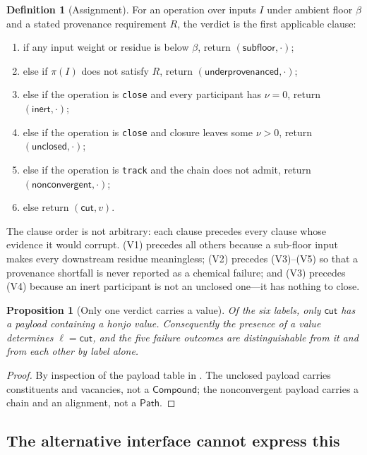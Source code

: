 \documentclass[11pt,twocolumn,a4paper]{article}
\theoremstyle{thmstyle}
\newtheorem{proposition}[theorem]{Proposition}
\theoremstyle{definition}
\newtheorem{definition}[theorem]{Definition}
\theoremstyle{remark}
\newcommand{\flo}{\beta}
\newcommand{\hj}[1]{\texttt{#1}}
\newcommand{\Prov}{\pi}
\begin{document}
\begin{definition}[Assignment]
\label{def:verdict-assign}
For an operation over inputs $I$ under ambient floor $\flo$ and a stated
provenance requirement $R$, the verdict is the first applicable clause:
\begin{enumerate}[label=(V\arabic*),leftmargin=*]
\item if any input weight or residue is below $\flo$, return
$(\textsf{subfloor},\cdot)$;
\item else if $\Prov(I)$ does not satisfy $R$, return
$(\textsf{underprovenanced},\cdot)$;
\item else if the operation is \hj{close} and every participant has
$\nu=0$, return $(\textsf{inert},\cdot)$;
\item else if the operation is \hj{close} and closure leaves some
$\nu>0$, return $(\textsf{unclosed},\cdot)$;
\item else if the operation is \hj{track} and the chain does not admit,
return $(\textsf{nonconvergent},\cdot)$;
\item else return $(\textsf{cut},v)$.
\end{enumerate}
\end{definition}

The clause order is not arbitrary: each clause precedes every clause
whose evidence it would corrupt. (V1) precedes all others because a
sub-floor input makes every downstream residue meaningless; (V2) precedes
(V3)--(V5) so that a provenance shortfall is never reported as a chemical
failure; and (V3) precedes (V4) because an inert participant is not an
unclosed one---it has nothing to close.

\begin{proposition}[Only one verdict carries a value]
\label{prop:one-value}
Of the six labels, only $\textsf{cut}$ has a payload containing a honjo
value. Consequently the presence of a value determines
$\ell=\textsf{cut}$, and the five failure outcomes are distinguishable
from it and from each other by label alone.
\end{proposition}

\begin{proof}
By inspection of the payload table in . The
\textsf{unclosed} payload carries constituents and vacancies, not a
$\mathsf{Compound}$; the \textsf{nonconvergent} payload carries a chain
and an alignment, not a $\mathsf{Path}$.
\end{proof}

\subsection{The alternative interface cannot express this}
\end{document}
